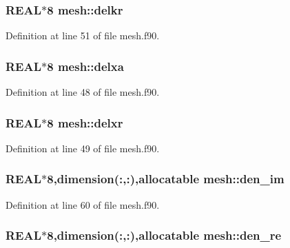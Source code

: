 \hypertarget{namespacemesh_a30ce8cdfbc09510b555134e5ee1c2472}{
\subsubsection[{delkr}]{\setlength{\rightskip}{0pt plus 5cm}REAL$\ast$8 {\bf mesh::delkr}}}
\label{namespacemesh_a30ce8cdfbc09510b555134e5ee1c2472}


Definition at line 51 of file mesh.f90.

\hypertarget{namespacemesh_a4bbd964b605a9fedc6fd4b5feaf2d226}{
\subsubsection[{delxa}]{\setlength{\rightskip}{0pt plus 5cm}REAL$\ast$8 {\bf mesh::delxa}}}
\label{namespacemesh_a4bbd964b605a9fedc6fd4b5feaf2d226}


Definition at line 48 of file mesh.f90.

\hypertarget{namespacemesh_a8517784a828d82832ad38e911e58cdf1}{
\subsubsection[{delxr}]{\setlength{\rightskip}{0pt plus 5cm}REAL$\ast$8 {\bf mesh::delxr}}}
\label{namespacemesh_a8517784a828d82832ad38e911e58cdf1}


Definition at line 49 of file mesh.f90.

\hypertarget{namespacemesh_a88e07a02f831434825843fa4d74b7bc0}{
\subsubsection[{den\_\-im}]{\setlength{\rightskip}{0pt plus 5cm}REAL$\ast$8,dimension(:,:),allocatable {\bf mesh::den\_\-im}}}
\label{namespacemesh_a88e07a02f831434825843fa4d74b7bc0}


Definition at line 60 of file mesh.f90.

\hypertarget{namespacemesh_af15f870e8317605924334a07ecfe3b28}{
\subsubsection[{den\_\-re}]{\setlength{\rightskip}{0pt plus 5cm}REAL$\ast$8,dimension(:,:),allocatable {\bf mesh::den\_\-re}}}
\label{namespacemesh_af15f870e8317605924334a07ecfe3b28}


